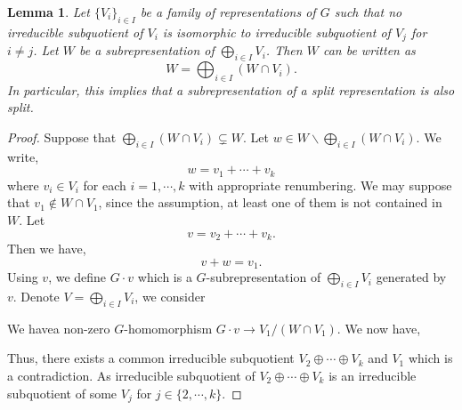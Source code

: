 \documentclass[8pt]{article}
\newtheorem{lemma}{Lemma}[section]
\begin{document}
\begin{lemma}
  \label{lemma_91}
  Let $\{V_i\}_{i\in I}$ be a family of representations of $G$ such that no irreducible subquotient of $V_i$ is isomorphic to irreducible subquotient of $V_j$ for $i\not=j$. Let $W$ be a subrepresentation of $\bigoplus_{i\in I}V_i$.
  Then $W$ can be written as 
  \begin{equation*}
    W = \bigoplus_{i\in I}(W\cap V_i).
  \end{equation*}
  In particular, this implies that a subrepresentation of a split representation is also split.
\end{lemma}

\begin{proof}
  Suppose that $\bigoplus_{i\in I}(W\cap V_i)\subsetneq W$. Let $w\in W\backslash \bigoplus_{i\in I}(W\cap V_i)$. We write,
  \begin{equation*}
    w = v_1+\cdots+v_k
  \end{equation*}
  where $v_i\in V_i$ for each $i=1,\cdots,k$ with appropriate renumbering. We may suppose that $v_1\not\in W\cap V_1$, since the assumption, at least one of them is not contained in $W$. Let 
  \begin{equation*}
    v = v_2+\cdots+v_k.
  \end{equation*}
  Then we have,
  \begin{equation*}
    v+w = v_1.
  \end{equation*}
  Using $v$, we define $G\cdot v$ which is a $G$-subrepresentation of $\bigoplus_{i\in I}V_i$ generated by $v$. Denote $V = \bigoplus_{i\in I}V_i$, we consider
  \begin{center}
  \end{center}
  We havea non-zero $G$-homomorphism $G\cdot v\to V_1/(W\cap V_1)$. We now have,
  \begin{center}
  \end{center}
  Thus, there exists a common irreducible subquotient $V_2\oplus\cdots\oplus V_k$ and $V_1$ which is a contradiction. As irreducible subquotient of $V_2\oplus\cdots\oplus V_k$ is an irreducible subquotient of some $V_j$ for $j\in\{2,\cdots,k\}$.
\end{proof}
\end{document}
